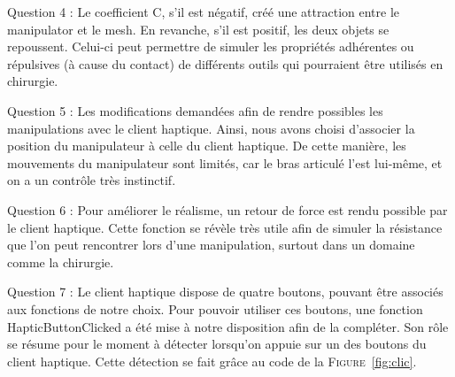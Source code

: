 \documentclass[a4paper,12pt]{article}
\begin{document}
Question 4 : Le coefficient C, s'il est négatif, créé une attraction entre le manipulator et le mesh. En revanche, s'il est positif, les deux objets se repoussent. Celui-ci peut permettre de simuler les propriétés adhérentes ou répulsives (à cause du contact) de différents outils qui pourraient être utilisés en chirurgie.


Question 5 : Les modifications demandées afin de rendre possibles les manipulations avec le client haptique. Ainsi, nous avons choisi d'associer la position du manipulateur à celle du client haptique. De cette manière, les mouvements du manipulateur sont limités, car le bras articulé l'est lui-même, et on a un contrôle très instinctif.

Question 6 : Pour améliorer le réalisme, un retour de force est rendu possible par le client haptique. Cette fonction se révèle très utile afin de simuler la résistance que l'on peut rencontrer lors d'une manipulation, surtout dans un domaine comme la chirurgie.

Question 7 : Le client haptique dispose de quatre boutons, pouvant être associés aux fonctions de notre choix. Pour pouvoir utiliser ces boutons, une fonction \og{}HapticButtonClicked\fg{} a été mise à notre disposition afin de la compléter. Son rôle se résume pour le moment à détecter lorsqu'on appuie sur un des boutons du client haptique. Cette détection se fait grâce au code de la \textsc{Figure}~\ref{fig:clic}.
\end{document}
